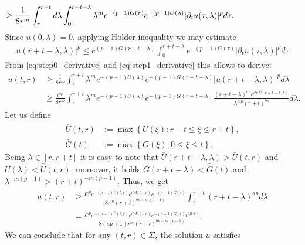 \documentclass[11pt,reqno]{amsart}
\theoremstyle{definition}
\numberwithin{equation}{section}
\newenvironment{proofof}[1]{\smallskip\noindent{\textbf{Proof~of~#1.}}%
  \hspace{1pt}}{\hspace{-5pt}{\nobreak\quad\nobreak\hfill\nobreak%
    $\square$\vspace{2pt}\par}\smallskip\goodbreak}
\newcommand{\bbar}[1]{\bar{\bar{#1}}}
\begin{document}
\begin{proofof}{Theorem \ref{th.main.derivative}}
\begin{equation}
\begin{aligned}
%
& \hspace{-72pt} \geq \frac{1}{8r^m}\int_r^{r+t} d\lambda \int_0^{r+t-\lambda} \lambda^m e^{-(p-1)G(\tau)}e^{-(p-1)U(\lambda)}|\partial_t u(\tau,\lambda)|^p d\tau. 
\end{aligned}    
\end{equation}
% 
Since $u(0,\lambda)=0$, applying H\"older inequality we may estimate 
%
\begin{align*}
|u(r+t-\lambda,\lambda)|^p \leq e^{(p-1)G(r+t-\lambda)}\int_0^{r+t-\lambda} e^{-(p-1)G(\tau)}|\partial_t u(\tau,\lambda)|^pd\tau.
\end{align*}
%
From \eqref{eq:step0_derivative} and \eqref{eq:step1_derivative} this allows to derive:
%
\begin{equation}
\begin{aligned}
u(t,r)&\geq \frac{1}{8r^m}\int_r^{r+t} \lambda^m e^{-(p-1)U(\lambda)}e^{-(p-1)G(r+t-\lambda)} |u(r+t-\lambda,\lambda)|^pd\lambda \\
%
&\geq   \frac{C^p}{8r^m}\int_r^{r+t} \lambda^m e^{-(p-1)U(\lambda)}e^{-(p-1)G(r+t-\lambda)}\frac{(r+t-\lambda)^{ap} e^{dp\,\bar U(r+t-\lambda,\lambda)}} {\lambda^{mp}(r+t)^{bp}}d\lambda.
\end{aligned}
\end{equation}
%
Let us define
\begin{equation}
\begin{aligned}
\bbar U(t,r)&:=\max\left\{U(\xi): r-t\leq\xi\leq r+t \right\},\\
\bbar{G}(t)&:=\max\left\{G(\xi): 0\leq\xi\leq t\right\}.
\end{aligned}   
\end{equation}
%
Being $\lambda\in [r,r+t]$ it is easy to note that $\bar U(r+t-\lambda,\lambda)>\bar U(t,r)$ and $U(\lambda)<\bbar U(t,r)$; moreover, it holds $G(r+t-\lambda)<\bbar{G}(t)$ and $\lambda^{-m(p-1)}>(r+t)^{-m(p-1)}$.
%
Thus, we get
%
\begin{equation}
\begin{aligned} 
\label{eq:step2_derivative}
u(t,r)&\geq \frac{C^p e^{-(p-1)\bbar{U}(t,r)}e^{dp \bar{U}(t,r)}e^{-(p-1)\bbar{G}(t)}} {8r^m(r+t)^{bp+m(p-1)}}\int_r^{r+t} (r+t-\lambda)^{ap}d\lambda\\
%
&= \frac{C^p e^{-(p-1)\bbar{U}(t,r)}e^{dp \bar{U}(t,r)}e^{-(p-1)\bbar{G}(t)}t^{ap+1}}{8(ap+1)r^m(r+t)^{bp+m(p-1)}}.
\end{aligned}
\end{equation}
%
We can conclude that for any  $(t,r)\in \Sigma_\delta$ the solution $u$ satisfies
\begin{equation}

\end{equation}
\end{proofof}
\end{document}
